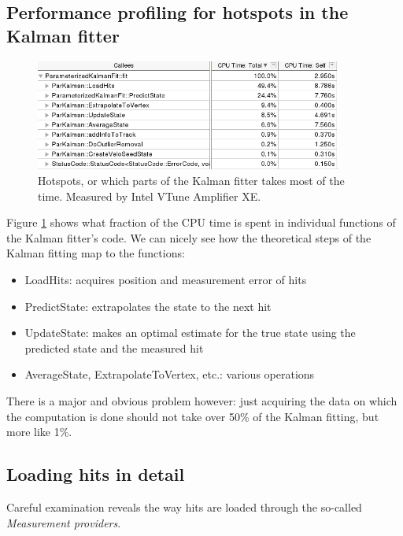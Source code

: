 \documentclass[12pt]{article}
\begin{document}
\subsection{Performance profiling for hotspots in the Kalman fitter}

\begin{figure}[H]
	\begin{center}
		\includegraphics[width=0.9\textwidth]{kalmanfit_overall_breakdown}
	\end{center}
	\caption{Hotspots, or which parts of the Kalman fitter takes most of the time. Measured by Intel VTune Amplifier XE.}
	\label{fig_kalman_vtune_initial}
\end{figure}

Figure \ref{fig_kalman_vtune_initial} shows what fraction of the CPU time is spent in individual functions of the Kalman fitter's code. We can nicely see how the theoretical steps of the Kalman fitting map to the functions:
\begin{itemize}
	\item LoadHits: acquires position and measurement error of hits
	\item PredictState: extrapolates the state to the next hit
	\item UpdateState: makes an optimal estimate for the true state using the predicted state and the measured hit
	\item AverageState, ExtrapolateToVertex, etc.: various operations
\end{itemize}
There is a major and obvious problem however: just acquiring the data on which the computation is done should not take over 50\% of the Kalman fitting, but more like 1\%.	


\subsection{Loading hits in detail}

Careful examination reveals the way hits are loaded through the so-called \textit{Measurement providers}.
	
\end{document}
